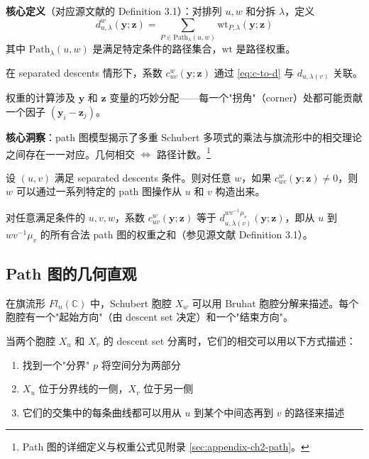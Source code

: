 \textbf{核心定义}（对应源文献的 Definition 3.1）：对排列 $u, w$ 和分拆 $\lambda$，定义
\begin{equation}
d_{u,\lambda}^w(\mathbf{y}; \mathbf{z}) = \sum_{P \in \mathrm{Path}_\lambda(u,w)} \mathrm{wt}_{P,\lambda}(\mathbf{y}; \mathbf{z})
\label{eq:d-u-lambda-w}
\end{equation}
其中 $\mathrm{Path}_\lambda(u,w)$ 是满足特定条件的路径集合，$\mathrm{wt}$ 是路径权重。

在 separated descents 情形下，系数 $c_{uv}^w(\mathbf{y}; \mathbf{z})$ 通过 \eqref{eq:c-to-d} 与 $d_{u,\lambda(v)}$ 关联。

权重的计算涉及 $\mathbf{y}$ 和 $\mathbf{z}$ 变量的巧妙分配——每一个"拐角"（corner）处都可能贡献一个因子 $(\mathbf{y}_i - \mathbf{z}_j)$。

\textbf{核心洞察}：path 图模型揭示了多重 Schubert 多项式的乘法与旗流形中的相交理论之间存在一一对应。几何相交 $\Leftrightarrow$ 路径计数。\footnote{Path 图的详细定义与权重公式见附录 \cref{sec:appendix-ch2-path}。}

\begin{Lemma}
\label{lema:PathExistence}
设 $(u, v)$ 满足 separated descents 条件。则对任意 $w$，如果 $c_{uv}^w(\mathbf{y}; \mathbf{z}) \neq 0$，则 $w$ 可以通过一系列特定的 path 图操作从 $u$ 和 $v$ 构造出来。
\end{Lemma}

\begin{Lemma}
\label{lema:WeightSum}
对任意满足条件的 $u, v, w$，系数 $c_{uv}^w(\mathbf{y}; \mathbf{z})$ 等于 $d_{u,\lambda(v)}^{w v^{-1}\mu_v}(\mathbf{y}; \mathbf{z})$，即从 $u$ 到 $w v^{-1}\mu_v$ 的所有合法 path 图的权重之和（参见源文献 Definition 3.1）。
\end{Lemma}

\subsection{Path 图的几何直观}

在旗流形 $Fl_n(\mathbb{C})$ 中，Schubert 胞腔 $X_w$ 可以用 Bruhat 胞腔分解来描述。每个胞腔有一个"起始方向"（由 descent set 决定）和一个"结束方向"。

当两个胞腔 $X_u$ 和 $X_v$ 的 descent set 分离时，它们的相交可以用以下方式描述：
\begin{enumerate}
\item 找到一个"分界" $p$ 将空间分为两部分
\item $X_u$ 位于分界线的一侧，$X_v$ 位于另一侧
\item 它们的交集中的每条曲线都可以用从 $u$ 到某个中间态再到 $v$ 的路径来描述
\end{enumerate}

